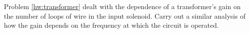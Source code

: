         Problem \ref{hw:transformer} dealt with the dependence of a transformer's
        gain on the number of loops of wire in the input solenoid.
        Carry out a similar analysis of how the gain depends on the frequency
        at which the circuit is operated.

